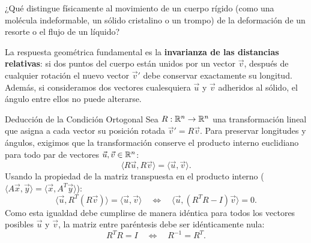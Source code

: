\documentclass[11pt,letterpaper]{article}
\begin{document}
\setlength{\abovedisplayskip}{6pt}
\setlength{\belowdisplayskip}{6pt}
\setlength{\textfloatsep}{10pt}
\setlength{\intextsep}{8pt}
\color{blackmain}



¿Qué distingue físicamente al movimiento de un cuerpo rígido (como una molécula indeformable, un sólido cristalino o un trompo) de la deformación de un resorte o el flujo de un líquido? 

La respuesta geométrica fundamental es la \textbf{invarianza de las distancias relativas}: si dos puntos del cuerpo están unidos por un vector $\vec{v}$, después de cualquier rotación el nuevo vector $\vec{v}'$ debe conservar exactamente su longitud. Además, si consideramos dos vectores cualesquiera $\vec{u}$ y $\vec{v}$ adheridos al sólido, el ángulo entre ellos no puede alterarse.

\begin{intuitionbox}{Deducción de la Condición Ortogonal}
Sea $R: \mathbb{R}^n \to \mathbb{R}^n$ una transformación lineal que asigna a cada vector su posición rotada $\vec{v}' = R\vec{v}$.
Para preservar longitudes y ángulos, exigimos que la transformación conserve el producto interno euclidiano para todo par de vectores $\vec{u}, \vec{v} \in \mathbb{R}^n$:
\[
\langle R\vec{u}, R\vec{v} \rangle = \langle \vec{u}, \vec{v} \rangle.
\]
Usando la propiedad de la matriz transpuesta en el producto interno ($\langle A\vec{x}, \vec{y} \rangle = \langle \vec{x}, A^T \vec{y} \rangle$):
\[
\langle \vec{u}, R^T (R\vec{v}) \rangle = \langle \vec{u}, \vec{v} \rangle \quad \Longleftrightarrow \quad \langle \vec{u}, (R^T R - I)\vec{v} \rangle = 0.
\]
Como esta igualdad debe cumplirse de manera idéntica para todos los vectores posibles $\vec{u}$ y $\vec{v}$, la matriz entre paréntesis debe ser idénticamente nula:
\[
\boxed{R^T R = I} \quad \Longleftrightarrow \quad R^{-1} = R^T.
\]
\end{intuitionbox}

\end{document}
